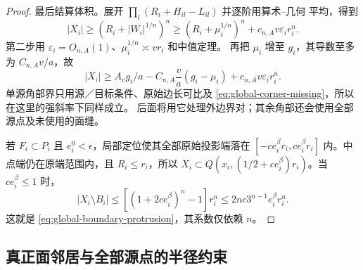\begin{proof}
最后结算体积。展开 \(\prod_l(R_i+H_{il}-L_{il})\) 并逐阶用算术--几何
平均，得到
\[
 |X_i|\ge(R_i+|W_i|^{1/n})^n
 \ge(R_i+\mu_i^{1/n})^n+c_{n,A}v\varepsilon_i r_i^n.
\]
第二步用 \(\varepsilon_i=O_{n,A}(1)\)、\(\mu_i^{1/n}\asymp vr_i\) 和中值定理。
再把 \(\mu_i\) 增至 \(g_i\)，其导数至多为 \(C_{n,A}v/a\)，故
\begin{equation}\label{eq:global-capacity-volume}
 |X_i|\ge A_vg_i/a-C_{n,A}\frac va(g_i-\mu_i)
                   +c_{n,A}v\varepsilon_i r_i^n.
\end{equation}
单源角部界只用源／目标条件、原始边长可比及
\eqref{eq:global-corner-missing}，所以在这里的强斜率下同样成立。
后面将用它处理外边界对；其余角部还会使用全部源点及未使用的面缝。

若 \(F_i\subset P_i\) 且 \(e_i^0<\epsilon\)，局部定位使其全部原始投影端落在
\([-ce_i^\beta r_i,ce_i^\beta r_i]\) 内。中点端仍在原端范围内，且
\(R_i\le r_i\)，所以
\(X_i\subset Q(x_i,(1/2+ce_i^\beta)r_i)\)。当 \(ce_i^\beta\le1\) 时，
\[
 |X_i\setminus B_i|\le[(1+2ce_i^\beta)^n-1]r_i^n
 \le2nc3^{n-1}e_i^\beta r_i^n.
\]
这就是 \eqref{eq:global-boundary-protrusion}，其系数仅依赖 \(n\)。
\end{proof}

\subsection{真正面邻居与全部源点的半径约束}

